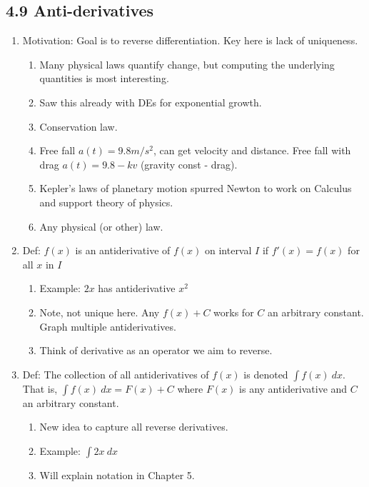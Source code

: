 \documentclass{article}
\begin{document}
\subsection{4.9 Anti-derivatives}
\begin{enumerate}

\item Motivation: Goal is to reverse differentiation. Key here is lack of uniqueness.
\begin{enumerate}
\item Many physical laws quantify change, but computing the underlying quantities is most interesting.
\item Saw this already with DEs for exponential growth.
\item Conservation law.
\item Free fall $a(t) = 9.8 m/s^2$, can get velocity and distance. Free fall with drag $a(t) = 9.8 - kv$ (gravity const - drag).
\item Kepler's laws of planetary motion spurred Newton to work on Calculus and support theory of physics.
\item Any physical (or other) law.
\end{enumerate}

\item Def: $f(x)$ is an antiderivative of $f(x)$ on interval $I$ if $f'(x) = f(x)$ for all $x$ in $I$
\begin{enumerate}
\item Example: $2x$ has antiderivative $x^2$
\item Note, not unique here. Any $f(x)+C$ works for $C$ an arbitrary constant. Graph multiple antiderivatives.
\item Think of derivative as an operator we aim to reverse.
\end{enumerate}

\item Def: The collection of all antiderivatives of $f(x)$ is denoted $\int f(x) ~dx$. That is, $\int f(x) ~dx=F(x)+C$ where $F(x)$ is any antiderivative and $C$ an arbitrary constant.
\begin{enumerate}
\item New idea to capture all reverse derivatives.
\item Example: $\int 2x ~dx$
\item Will explain notation in Chapter 5.
\end{enumerate}



\end{enumerate}
\end{document}
